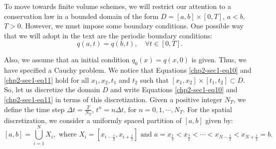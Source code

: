 To move towards finite volume schemes, we will restrict our attention
to a conservation law in a bounded domain of the form 
$D = [a,b]\times[0,T]$, $a<b$, $T>0$. However, we must 
impose some boundary conditions. One possible way that we will adopt 
in the text are the periodic boundary conditions:
\begin{equation}
	\label{chp2-sec1-eq12}
	{q}(a, t) = {q}(b, t),\quad \forall t \in [0, T].
\end{equation}

Also, we assume that an initial condition $q_0(x) = q(x,0)$ is given.
Thus, we have specified a Cauchy problem.
We notice that Equations \eqref{chp2-sec1-eq10} and \eqref{chp2-sec1-eq11}
hold for all $x_1, x_2, t_1$ and $t_2$ such that
$[x_1, x_2] \times [t_1, t_2] \subset D$.
So, let us discretize the domain $D$ and write 
Equations \eqref{chp2-sec1-eq10} and \eqref{chp2-sec1-eq11} in terms of this discretization.
Given a positive integer $N_T$, we define the time step 
$\Delta t = \frac{T}{N_T}$, $t^{n} = n \Delta t$, for $n = 0, 1 ,\cdots, N_T$.
For the spatial discretization, we consider a uniformly spaced partition of $[a, b]$ given by: 
\begin{equation}
	\label{chp2-sec1-eq13}
	[a,b] = \bigcup_{i=1}^N X_i, 
	\text{ where } X_i= [x_{i-\frac{1}{2}}, x_{i+\frac{1}{2}}] \text{ and } 
	a = x_{\frac{1}{2}} < x_{\frac{3}{2}} < \cdots < x_{N-\frac{1}{2}} < x_{N+\frac{1}{2}} = b.
\end{equation}

